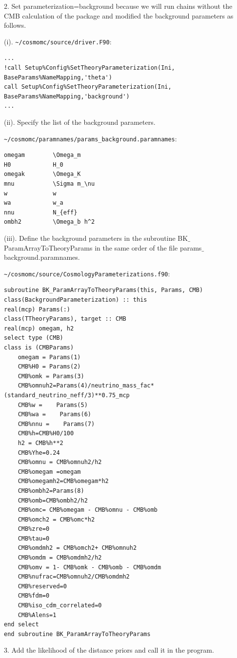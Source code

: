 \documentclass[floatfix,aps,amsmath,nofootinbib,onecolumn,10pt]{revtex4}
\begin{document}
\begin{appendix}
2. Set parameterization=background because we will run chains without the CMB calculation of the package and modified the background parameters as follows.

(i). \verb|~/cosmomc/source/driver.F90|:
\begin{lstlisting}
...
!call Setup%Config%SetTheoryParameterization(Ini, BaseParams%NameMapping,'theta')
call Setup%Config%SetTheoryParameterization(Ini, BaseParams%NameMapping,'background')
...
\end{lstlisting}

(ii). Specify the list of the background parameters.

\verb|~/cosmomc/paramnames/params_background.paramnames|:
\begin{lstlisting}
omegam        \Omega_m
H0            H_0
omegak        \Omega_K
mnu           \Sigma m_\nu		
w             w	
wa            w_a 
nnu           N_{eff}  
ombh2         \Omega_b h^2
\end{lstlisting}

(iii). Define the background parameters in the subroutine BK$\_$ParamArrayToTheoryParams in the same order of the file params$\_$background.paramnames. 

\verb|~/cosmomc/source/CosmologyParameterizations.f90|:
\begin{lstlisting}
subroutine BK_ParamArrayToTheoryParams(this, Params, CMB)
class(BackgroundParameterization) :: this
real(mcp) Params(:)
class(TTheoryParams), target :: CMB
real(mcp) omegam, h2
select type (CMB)
class is (CMBParams)
    omegam = Params(1)
    CMB%H0 = Params(2)
    CMB%omk = Params(3)
    CMB%omnuh2=Params(4)/neutrino_mass_fac*(standard_neutrino_neff/3)**0.75_mcp
    CMB%w =    Params(5)
    CMB%wa =    Params(6)
    CMB%nnu =    Params(7)
    CMB%h=CMB%H0/100
    h2 = CMB%h**2
    CMB%Yhe=0.24
    CMB%omnu = CMB%omnuh2/h2
    CMB%omegam =omegam
    CMB%omegamh2=CMB%omegam*h2
    CMB%ombh2=Params(8)
    CMB%omb=CMB%ombh2/h2
    CMB%omc= CMB%omegam - CMB%omnu - CMB%omb
    CMB%omch2 = CMB%omc*h2        
    CMB%zre=0
    CMB%tau=0
    CMB%omdmh2 = CMB%omch2+ CMB%omnuh2
    CMB%omdm = CMB%omdmh2/h2
    CMB%omv = 1- CMB%omk - CMB%omb - CMB%omdm
    CMB%nufrac=CMB%omnuh2/CMB%omdmh2
    CMB%reserved=0
    CMB%fdm=0
    CMB%iso_cdm_correlated=0
    CMB%Alens=1
end select
end subroutine BK_ParamArrayToTheoryParams
\end{lstlisting}

3. Add the likelihood of the distance priors and call it in the program.


\end{appendix}
\end{document}
